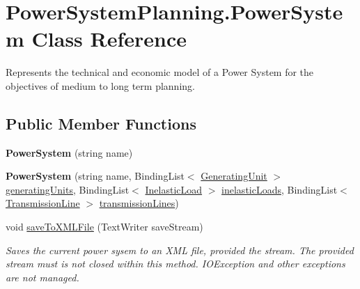 \hypertarget{class_power_system_planning_1_1_power_system}{}\section{Power\+System\+Planning.\+Power\+System Class Reference}
\label{class_power_system_planning_1_1_power_system}


Represents the technical and economic model of a Power System for the objectives of medium to long term planning.  


\subsection*{Public Member Functions}
\begin{DoxyCompactItemize}
\item 
{\bfseries Power\+System} (string name)\hypertarget{class_power_system_planning_1_1_power_system_a6892a52047756c1fc3cf988695e1b787}{}\label{class_power_system_planning_1_1_power_system_a6892a52047756c1fc3cf988695e1b787}

\item 
{\bfseries Power\+System} (string name, Binding\+List$<$ \hyperlink{class_power_system_planning_1_1_generating_unit}{Generating\+Unit} $>$ \hyperlink{class_power_system_planning_1_1_power_system_a899692153e8c860b54745c503f8af765}{generating\+Units}, Binding\+List$<$ \hyperlink{class_power_system_planning_1_1_inelastic_load}{Inelastic\+Load} $>$ \hyperlink{class_power_system_planning_1_1_power_system_a0445fbb84b2deb936cfc1b7b38d8f5ed}{inelastic\+Loads}, Binding\+List$<$ \hyperlink{class_power_system_planning_1_1_transmission_line}{Transmission\+Line} $>$ \hyperlink{class_power_system_planning_1_1_power_system_a1394f9c3a23efcc0cd93acb46611c102}{transmission\+Lines})\hypertarget{class_power_system_planning_1_1_power_system_a127fe1b1817e0e5b8060210dcf6490a6}{}\label{class_power_system_planning_1_1_power_system_a127fe1b1817e0e5b8060210dcf6490a6}

\item 
void \hyperlink{class_power_system_planning_1_1_power_system_a0f3c09d821634b02e79b54c82297e9f6}{save\+To\+X\+M\+L\+File} (Text\+Writer save\+Stream)
\begin{DoxyCompactList}\small\item\em Saves the current power sysem to an X\+ML file, provided the stream. The provided stream must is not closed within this method. I\+O\+Exception and other exceptions are not managed. \end{DoxyCompactList}\end{DoxyCompactItemize}
